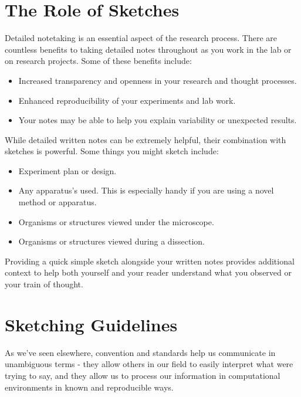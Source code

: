 \documentclass[
]{book}
\providecommand{\tightlist}{%
  \setlength{\itemsep}{0pt}\setlength{\parskip}{0pt}}
\begin{document}
\hypertarget{the-role-of-sketches}{%
\section{The Role of Sketches}\label{the-role-of-sketches}}

Detailed notetaking is an essential aspect of the research process. There are countless benefits to taking detailed notes throughout as you work in the lab or on research projects. Some of these benefits include:

\begin{itemize}
\tightlist
\item
  Increased transparency and openness in your research and thought processes.
\item
  Enhanced reproducibility of your experiments and lab work.
\item
  Your notes may be able to help you explain variability or unexpected results.
\end{itemize}

While detailed written notes can be extremely helpful, their combination with sketches is powerful. Some things you might sketch include:

\begin{itemize}
\tightlist
\item
  Experiment plan or design.
\item
  Any apparatus's used. This is especially handy if you are using a novel method or apparatus.
\item
  Organisms or structures viewed under the microscope.
\item
  Organisms or structures viewed during a dissection.
\end{itemize}

Providing a quick simple sketch alongside your written notes provides additional context to help both yourself and your reader understand what you observed or your train of thought.

\hypertarget{sketching-guidelines}{%
\section{Sketching Guidelines}\label{sketching-guidelines}}

As we've seen elsewhere, convention and standards help us communicate in unambiguous terms - they allow others in our field to easily interpret what we\textquotesingle re trying to say, and they allow us to process our information in computational environments in known and reproducible ways.
\end{document}
